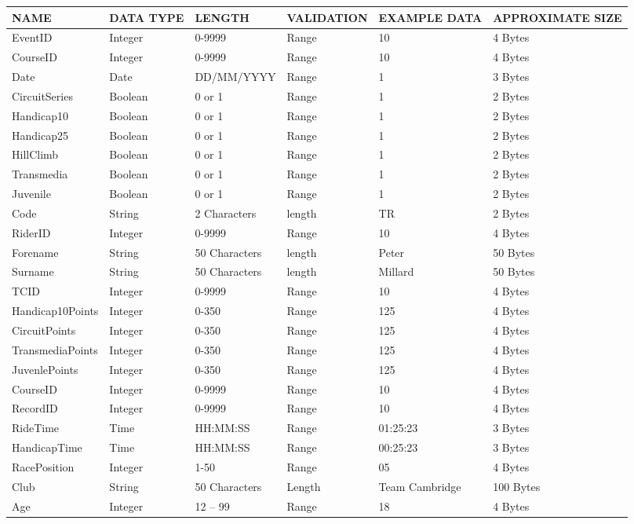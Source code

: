 \begin{tabular}{|p{1.5cm}|p{1.5cm}|l|l|l|p{2.5cm}|}
	\hline
	NAME & DATA TYPE & LENGTH & VALIDATION & EXAMPLE DATA & APPROXIMATE SIZE \\ \hline
	EventID & Integer & 0-9999 & Range & 10 & 4 Bytes \\ \hline
	CourseID & Integer & 0-9999 & Range & 10 & 4 Bytes \\ \hline
	Date & Date & DD/MM/YYYY & Range & 1 & 3 Bytes \\ \hline
	CircuitSeries & Boolean & 0 or 1 & Range & 1 & 2 Bytes \\ \hline
	Handicap10 & Boolean & 0 or 1 & Range & 1 & 2 Bytes \\ \hline
	Handicap25 & Boolean & 0 or 1 & Range & 1 & 2 Bytes \\ \hline
	HillClimb & Boolean & 0 or 1 & Range & 1 & 2 Bytes \\ \hline
	Transmedia & Boolean & 0 or 1 & Range & 1 & 2 Bytes \\ \hline
	Juvenile & Boolean & 0 or 1 & Range & 1 & 2 Bytes \\ \hline
	Code & String & 2 Characters & length & TR & 2 Bytes \\ \hline
	RiderID & Integer & 0-9999 & Range & 10 & 4 Bytes \\ \hline
	Forename & String & 50 Characters & length & Peter & 50 Bytes \\ \hline
	Surname & String & 50 Characters & length & Millard & 50 Bytes \\ \hline
	TCID & Integer & 0-9999 & Range & 10 & 4 Bytes \\ \hline
	Handicap10Points & Integer & 0-350 & Range & 125 & 4 Bytes \\ \hline
	CircuitPoints & Integer & 0-350 & Range & 125 & 4 Bytes \\ \hline
	TransmediaPoints & Integer & 0-350 & Range & 125 & 4 Bytes \\ \hline
	JuvenlePoints & Integer & 0-350 & Range & 125 & 4 Bytes \\ \hline
	CourseID & Integer & 0-9999 & Range & 10 & 4 Bytes \\ \hline
	RecordID & Integer & 0-9999 & Range & 10 & 4 Bytes \\ \hline
	RideTime & Time & HH:MM:SS & Range & 01:25:23 & 3 Bytes \\ \hline
	HandicapTime & Time & HH:MM:SS & Range & 00:25:23 & 3 Bytes \\ \hline
	RacePosition & Integer & 1-50 & Range & 05 & 4 Bytes \\ \hline
	Club & String & 50 Characters & Length & Team Cambridge & 100 Bytes \\ \hline
	Age & Integer & 12 – 99 & Range & 18 & 4 Bytes \\ \hline
\end{tabular}

